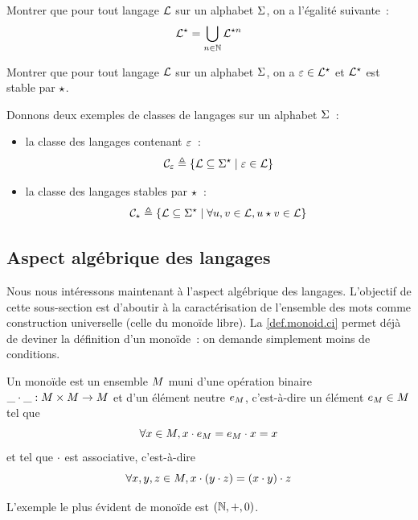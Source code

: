 \begin{exercise}
  Montrer que pour tout langage $\mathcal L$ sur un alphabet $\Sigma$, on a l'égalité
  suivante~:
  \[\mathcal L^{\star} = \bigcup_{n \in \mathbb N} \mathcal L^{\mathbin{\star} n}\]
\end{exercise}

\begin{exercise}
  Montrer que pour tout langage $\mathcal L$ sur un alphabet $\Sigma$, on a
  $\varepsilon \in \mathcal L^{\mathbin{\star}}$ et $\mathcal L^{\mathbin{\star}}$ est stable par $\mathbin{\star}$.
\end{exercise}

\begin{example}
  Donnons deux exemples de classes de langages sur un alphabet $\Sigma$~:
  \begin{itemize}
  \item la classe des langages contenant $\varepsilon$~:
    \[\mathcal{C}_\varepsilon \triangleq \left\{ \mathcal L \subseteq \Sigma^{\star} \;\middle\vert\; \varepsilon\in\mathcal L \right\}\]
  \item la classe des langages stables par $\mathbin{\star}$~:
    \[\mathcal{C}_{\mathbin{\star}} \triangleq
    \left\{ \mathcal L \subseteq\Sigma^{\star} \;\middle\vert\; \forall u,v\in\mathcal L, u\mathbin{\star}v \in \mathcal L \right\}
    \]
  \end{itemize}
\end{example}

\subsection{Aspect algébrique des langages}

Nous nous intéressons maintenant à l'aspect algébrique des langages. L'objectif
de cette sous-section est d'aboutir à la caractérisation de l'ensemble des mots
comme construction universelle (celle du monoïde libre). La
\cref{def.monoid.ci} permet déjà de deviner la définition d'un monoïde~: on
demande simplement moins de conditions.

\begin{definition}[Monoïde]
  Un monoïde est un ensemble $M$ muni d'une opération binaire
  $\mathord{\_}\mathbin{\cdot}\mathord{\_} : M \times M \to M$ et d'un élément neutre
  $e_{M}$, c'est-à-dire un élément $e_{M}\in M$ tel que
  \[\forall x\in M, x\mathbin{\cdot}e_{M} = e_{M}\mathbin{\cdot} x = x\]
  et tel que $\mathbin{\cdot}$ est associative, c'est-à-dire
  \[\forall x,y,z\in M, x\mathbin{\cdot} (y\mathbin{\cdot} z) = (x\mathbin{\cdot} y) \mathbin{\cdot} z\]
\end{definition}

\begin{example}
  L'exemple le plus évident de monoïde est $(\mathbb N,+,0)$.
\end{example}

